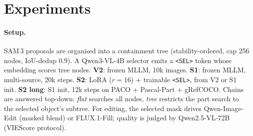 \section{Experiments}

\paragraph{Setup.}
SAM\,3 proposals are organised into a containment tree (stability-ordered, cap 256 nodes, IoU-dedup 0.9).
A Qwen3-VL-4B selector emits a \texttt{<SEL>} token whose embedding scores tree nodes.
\textbf{V2}: frozen MLLM, 10k images.
\textbf{S1}: frozen MLLM, multi-source, 20k steps.
\textbf{S2}: LoRA ($r{=}16$) + trainable \texttt{<SEL>}, from V2 or S1 init.
\textbf{S2 long}: S1 init, 12k steps on PACO + Pascal-Part + gRefCOCO.
Chains are answered top-down: \emph{flat} searches all nodes, \emph{tree} restricts the part search to the selected object's subtree.
For editing, the selected mask drives Qwen-Image-Edit (masked blend) or FLUX.1-Fill; quality is judged by Qwen2.5-VL-72B (VIEScore protocol).

